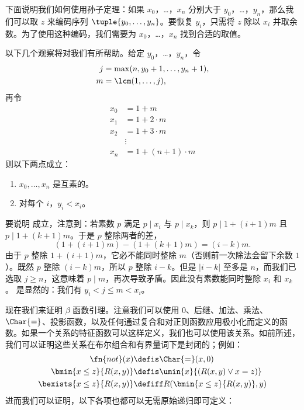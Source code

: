 \documentclass[../../../include/open-logic-section]{subfiles}
\begin{document}
下面说明我们如何使用孙子定理：如果 $x_0$，\dots，$x_n$ 分别大于 $y_0$，\dots，$y_n$，那么我们可以取 $z$ 来编码序列 $\tuple{y_0, \dots,y_n}$。要恢复 $y_i$，只需将 $z$ 除以 $x_i$ 并取余数。为了使用这种编码，我们需要为 $x_0$，\dots，$x_n$ 找到合适的取值。

以下几个观察将对我们有所帮助。给定 $y_0$，\dots，$y_n$，令
\begin{align*}
j &= \max(n, y_0 + 1, \dots, y_n + 1), \\
m &= \lcm(1,\dots,j),
\end{align*}
再令
\begin{align*}
x_0 & = 1 + m \\
x_1 & = 1 + 2 \cdot m \\
x_2 & = 1 + 3 \cdot m \\
& \vdots  \\
x_n & = 1 + (n+1) \cdot m
\end{align*}
则以下两点成立：

\begin{enumerate}
\item{} $x_0,\dots,x_n$ 是互素的。
\item{} 对每个 $i$，$y_i < x_i$。
\end{enumerate}

要说明  成立，注意到：若素数 $p$ 满足 $p \mid x_i$ 与 $p \mid x_k$，则 $p \mid 1 + (i+1) m$ 且 $p \mid 1 + (k+1) m$。于是 $p$ 整除两者的差，\[
(1 + (i+1)m) - (1+ (k+1)m) = (i-k) m.
\]由于 $p$ 整除 $1 + (i+1)m$，它必不能同时整除 $m$（否则前一次除法会留下余数 $1$）。既然 $p$ 整除 $(i-k)m$，所以 $p$ 整除 $i-k$。但是 $\left|i-k\right|$ 至多是 $n$，而我们已选取 $j \geq n$，这意味着 $p \mid m$，再次导致矛盾。因此没有素数能同时整除 $x_i$ 和 $x_k$。 是显然的：我们有 $y_i < j \leq m < x_i$。

现在我们来证明 $\beta$ 函数引理。注意我们可以使用 $0$、后继、加法、乘法、$\Char{=}$、投影函数，以及任何通过复合和对正则函数应用极小化而定义的函数。如果一个关系的特征函数可以这样定义，我们也可以使用该关系。如前所述，我们可以证明这些关系在布尔组合和有界量词下是封闭的；例如：
\begin{align*}
\fn{not}(x) & \defis \Char{=}(x,0)\\
\bmin{x \leq z}{R(x,y)} & \defis \umin{x}{(R(x,y) \lor x = z)}\\
\bexists{x \leq z}{R(x,y)} & \defiff R(\bmin{x \leq z}{R(x,y)}, y)
\end{align*}
进而我们可以证明，以下各项也都可以无需原始递归即可定义：
\end{document}
